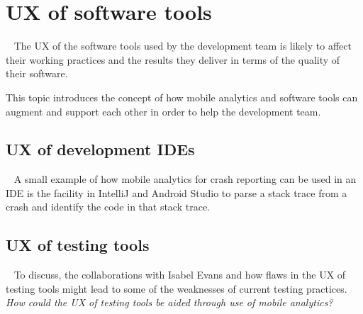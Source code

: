 \chapter{UX of software tools}~\label{ch:ux-of-software-tools}
The UX of the software tools used by the development team is likely to affect their working practices and the results they deliver in terms of the quality of their software.

This topic introduces the concept of how mobile analytics and software tools can augment and support each other in order to help the development team.

\section{UX of development IDEs}~\label{sec:ux-of-development-ides}
A small example of how mobile analytics for crash reporting can be used in an IDE is the facility in IntelliJ and Android Studio to parse a stack trace from a crash and identify the code in that stack trace.

\section{UX of testing tools}~\label{sec:ux-of-testing-tools}
To discuss, the collaborations with Isabel Evans and how flaws in the UX of testing tools might lead to some of the weaknesses of current testing practices. \emph{How could the UX of testing tools be aided through use of mobile analytics?}